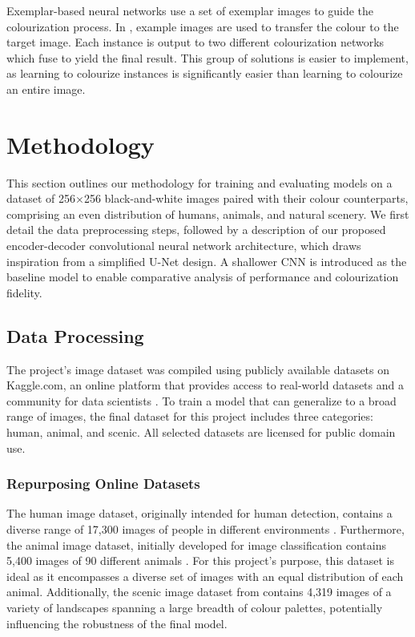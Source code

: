 \documentclass{article} %
\begin{document}
Exemplar-based neural networks use a set of exemplar images to guide the colourization process. In \citet{su2020instanceawareimagecolorization}, example images are
used to transfer the colour to the target image. Each instance is output to two different colourization networks which fuse to yield the final result. This group of 
solutions is easier to implement, as learning to colourize instances is significantly easier than learning to colourize an entire image. 

\section{Methodology}
\label{methodology}

This section outlines our methodology for training and evaluating models on a dataset of 256×256 black-and-white images paired with their colour counterparts, 
comprising an even distribution of humans, animals, and natural scenery. We first detail the data preprocessing steps, followed by a description of our proposed 
encoder-decoder convolutional neural network architecture, which draws inspiration from a simplified U-Net design. A shallower CNN is introduced as the baseline model 
to enable comparative analysis of performance and colourization fidelity.

\subsection{Data Processing}

 The project's image dataset was compiled using publicly available datasets on Kaggle.com, an online platform that provides access to real-world datasets and a community for data scientists \cite[]{kaggle}. To train a model that can generalize to a broad range of images, the final dataset for this project includes three categories: human, animal, and scenic. All selected datasets are licensed for public domain use. 

 \subsubsection{Repurposing Online Datasets}

The human image dataset, originally intended for human detection, contains a diverse range of 17,300 images of people in different environments \cite[]{kaggle_human}. Furthermore, the animal image dataset, initially developed for image classification contains 5,400 images of 90 different animals \cite[]{kaggle_animal}. For this project’s purpose, this dataset is ideal as it encompasses a diverse set of images with an equal distribution of each animal. Additionally, the scenic image dataset from \citet{kaggle_scene} contains 4,319 images of a variety of landscapes spanning a large breadth of colour palettes, potentially influencing the robustness of the final model.
\end{document}
